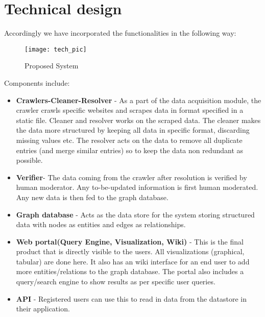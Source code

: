 \section{Technical design}
Accordingly we have incorporated the functionalities in the following way:\\

\begin{figure}[here]
\begin{center}	
\texttt{[image: tech\_pic]} 
\caption{Proposed System}
\label{fig:tech_pic}
\end{center}
\end{figure}

Components include:
\begin{itemize}
\item\textbf{Crawlers-Cleaner-Resolver} - As a part of the data acquisition module, the crawler crawls specific websites and scrapes data in format specified in a static file. Cleaner and resolver works on the scraped data. The cleaner makes the data more structured by keeping all data in specific format, discarding missing values etc. The resolver acts on the data to remove all duplicate entries (and merge similar entries) so to keep the data non redundant as possible.
\item\textbf{Verifier}- The data coming from the crawler after resolution is verified by human moderator. Any to-be-updated information is first human moderated. Any new data is then fed to the graph database.
\item\textbf{Graph database} - Acts as the data store for the system storing structured data with nodes as entities and edges as relationships.
\item\textbf{Web portal(Query Engine, Visualization, Wiki)} - This is the final product that is directly visible to the users. All visualizations (graphical, tabular) are done here. It also has an wiki interface for an end user to add more entities/relations to the graph database. The portal also includes a query/search engine to show results as per specific user queries.
\item\textbf{API} - Registered users can use this to read in data from the datastore in their application.
\end{itemize} 

